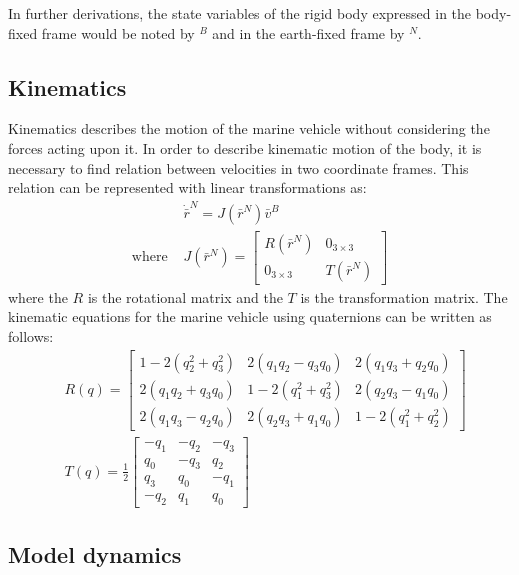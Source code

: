     In further derivations, the state variables of the rigid body expressed in the body-fixed frame would be noted by $^B$ and in the earth-fixed frame by $^N$.

\subsection{Kinematics}

    Kinematics describes the motion of the marine vehicle without considering the forces acting upon it.
    In order to describe kinematic motion of the body, it is necessary to find relation between velocities in two coordinate frames.
    This relation can be represented with linear transformations as:
    $$
    \begin{aligned}
        & \dot{\bar{r}}^N=J(\bar{r}^N) \bar{v}^B \\
        \text{where } & J(\bar{r}^N)=\left[\begin{array}{cc}
        R(\bar{r}^N) & 0_{3 \times 3} \\
        0_{3 \times 3} & T(\bar{r}^N)
        \end{array}\right]
    \end{aligned}
    $$
    where the $R$ is the rotational matrix and the $T$ is the transformation matrix. 
    The kinematic equations for the marine vehicle using quaternions can be written as follows:
    $$
    \begin{aligned}
    & R(q)=\left[\begin{array}{ccc}
        1-2\left(q_2^2+q_3^2\right) & 2\left(q_1 q_2-q_3 q_0\right) & 2\left(q_1 q_3+q_2 q_0\right) \\
        2\left(q_1 q_2+q_3 q_0\right) & 1-2\left(q_1^2+q_3^2\right) & 2\left(q_2 q_3-q_1 q_0\right) \\
        2\left(q_1 q_3-q_2 q_0\right) & 2\left(q_2 q_3+q_1 q_0\right) & 1-2\left(q_1^2+q_2^2\right)
        \end{array}\right]\\
    & T(q)=\frac{1}{2}\left[\begin{array}{rrr}
        -q_1 & -q_2 & -q_3 \\
        q_0 & -q_3 & q_2 \\
        q_3 & q_0 & -q_1 \\
        -q_2 & q_1 & q_0
        \end{array}\right]
    \end{aligned}
    $$

\subsection{Model dynamics}

